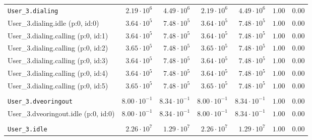 \begin{table}[htbp]
{\begin{tabular}{lrrrrrr}
\\[-8pt]\texttt{User\_3.dialing}                      &  $2.19 \cdot 10^{6}$ &  $4.49 \cdot 10^{6}$ &  $2.19 \cdot 10^{6}$ &  $4.49 \cdot 10^{6}$ &               $1.00$ &               $0.00$ \\
\hspace{3mm}User\_3.dialing.idle (p:0, id:0)          &  $3.64 \cdot 10^{5}$ &  $7.48 \cdot 10^{5}$ &  $3.64 \cdot 10^{5}$ &  $7.48 \cdot 10^{5}$ &               $1.00$ &               $0.00$ \\
\hspace{3mm}User\_3.dialing.calling (p:0, id:1)       &  $3.64 \cdot 10^{5}$ &  $7.48 \cdot 10^{5}$ &  $3.64 \cdot 10^{5}$ &  $7.48 \cdot 10^{5}$ &               $1.00$ &               $0.00$ \\
\hspace{3mm}User\_3.dialing.calling (p:0, id:2)       &  $3.65 \cdot 10^{5}$ &  $7.48 \cdot 10^{5}$ &  $3.65 \cdot 10^{5}$ &  $7.48 \cdot 10^{5}$ &               $1.00$ &               $0.00$ \\
\hspace{3mm}User\_3.dialing.calling (p:0, id:3)       &  $3.64 \cdot 10^{5}$ &  $7.48 \cdot 10^{5}$ &  $3.64 \cdot 10^{5}$ &  $7.48 \cdot 10^{5}$ &               $1.00$ &               $0.00$ \\
\hspace{3mm}User\_3.dialing.calling (p:0, id:4)       &  $3.64 \cdot 10^{5}$ &  $7.48 \cdot 10^{5}$ &  $3.64 \cdot 10^{5}$ &  $7.48 \cdot 10^{5}$ &               $1.00$ &               $0.00$ \\
\hspace{3mm}User\_3.dialing.calling (p:0, id:5)       &  $3.65 \cdot 10^{5}$ &  $7.48 \cdot 10^{5}$ &  $3.65 \cdot 10^{5}$ &  $7.48 \cdot 10^{5}$ &               $1.00$ &               $0.00$ \\
\\[-8pt]\texttt{User\_3.dveoringout}                  & $8.00 \cdot 10^{-1}$ & $8.34 \cdot 10^{-1}$ & $8.00 \cdot 10^{-1}$ & $8.34 \cdot 10^{-1}$ &               $1.00$ &               $0.00$ \\
\hspace{3mm}User\_3.dveoringout.idle (p:0, id:0)      & $8.00 \cdot 10^{-1}$ & $8.34 \cdot 10^{-1}$ & $8.00 \cdot 10^{-1}$ & $8.34 \cdot 10^{-1}$ &               $1.00$ &               $0.00$ \\
\\[-8pt]\texttt{User\_3.idle}                         &  $2.26 \cdot 10^{7}$ &  $1.29 \cdot 10^{7}$ &  $2.26 \cdot 10^{7}$ &  $1.29 \cdot 10^{7}$ &               $1.00$ &               $0.00$ \\

\end{tabular}}
\end{table}
